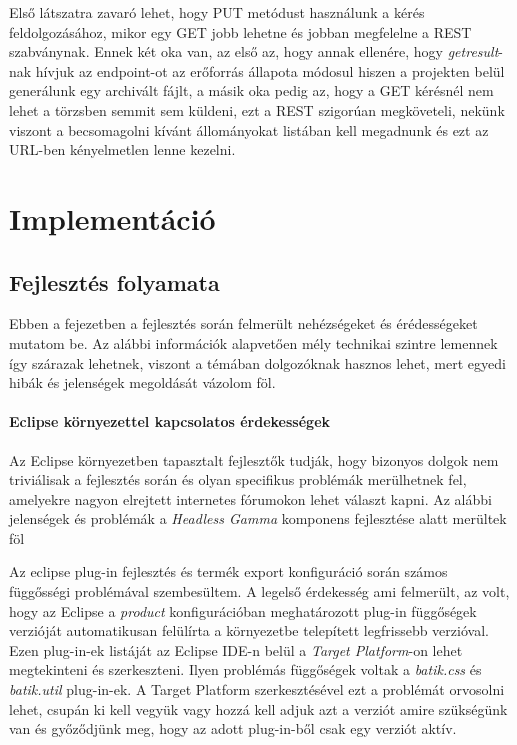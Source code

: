 Első látszatra zavaró lehet, hogy PUT metódust használunk a kérés feldolgozásához, mikor egy GET jobb lehetne és jobban megfelelne a REST szabványnak. Ennek két oka van, az első az, hogy annak ellenére, hogy \textit{getresult}-nak hívjuk az endpoint-ot az erőforrás állapota módosul hiszen a projekten belül generálunk egy archivált fájlt, a másik oka pedig az, hogy a GET kérésnél nem lehet a törzsben semmit sem küldeni, ezt a REST szigorúan megköveteli, nekünk viszont a becsomagolni kívánt állományokat listában kell megadnunk és ezt az URL-ben kényelmetlen lenne kezelni.


\section{Implementáció}

\subsection{Fejlesztés folyamata}


Ebben a fejezetben a fejlesztés során felmerült nehézségeket és érédességeket mutatom be. Az alábbi információk alapvetően mély technikai szintre lemennek így szárazak lehetnek, viszont a témában dolgozóknak hasznos lehet, mert egyedi hibák és jelenségek megoldását vázolom föl.

\paragraph{Eclipse környezettel kapcsolatos érdekességek} Az Eclipse környezetben tapasztalt fejlesztők tudják, hogy bizonyos dolgok nem triviálisak a fejlesztés során és olyan specifikus problémák merülhetnek fel, amelyekre nagyon elrejtett internetes fórumokon lehet választ kapni. Az alábbi jelenségek és problémák a \textit{Headless Gamma} komponens fejlesztése alatt merültek föl

Az eclipse plug-in fejlesztés és termék export konfiguráció során számos függősségi problémával szembesültem. A legelső érdekesség ami felmerült, az volt, hogy az Eclipse a \textit{product} konfigurációban meghatározott plug-in függőségek verzióját automatikusan felülírta a környezetbe telepített legfrissebb verzióval. Ezen plug-in-ek listáját az Eclipse IDE-n belül a \textit{Target Platform}-on lehet megtekinteni és szerkeszteni. Ilyen problémás függőségek voltak a \textit{batik.css} és \textit{batik.util} plug-in-ek. A Target Platform szerkesztésével ezt a problémát orvosolni lehet, csupán ki kell vegyük vagy hozzá kell adjuk azt a verziót amire szükségünk van és győződjünk meg, hogy az adott plug-in-ből csak egy verziót aktív.

